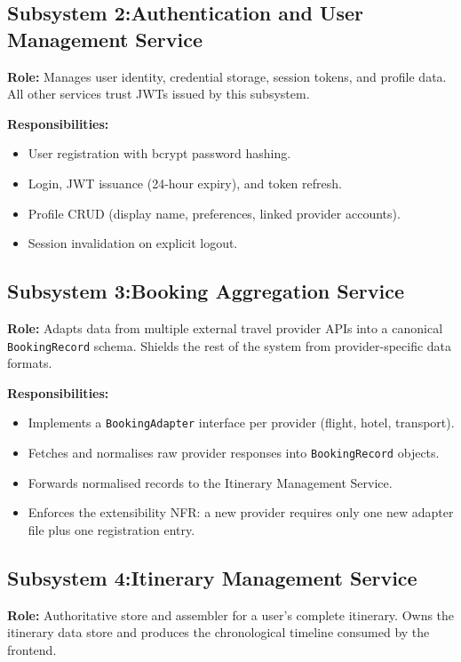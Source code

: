 \documentclass[12pt,a4paper]{article}
\begin{document}
\subsection{Subsystem 2:Authentication and User Management Service}

\textbf{Role:} Manages user identity, credential storage, session tokens, and profile data. All
other services trust JWTs issued by this subsystem.

\textbf{Responsibilities:}
\begin{itemize}[noitemsep]
  \item User registration with bcrypt password hashing.
  \item Login, JWT issuance (24-hour expiry), and token refresh.
  \item Profile CRUD (display name, preferences, linked provider accounts).
  \item Session invalidation on explicit logout.
\end{itemize}

\subsection{Subsystem 3:Booking Aggregation Service}

\textbf{Role:} Adapts data from multiple external travel provider APIs into a canonical
\texttt{BookingRecord} schema. Shields the rest of the system from provider-specific data formats.

\textbf{Responsibilities:}
\begin{itemize}[noitemsep]
  \item Implements a \texttt{BookingAdapter} interface per provider (flight, hotel, transport).
  \item Fetches and normalises raw provider responses into \texttt{BookingRecord} objects.
  \item Forwards normalised records to the Itinerary Management Service.
  \item Enforces the extensibility NFR: a new provider requires only one new adapter file plus
        one registration entry.
\end{itemize}

\subsection{Subsystem 4:Itinerary Management Service}

\textbf{Role:} Authoritative store and assembler for a user's complete itinerary. Owns the
itinerary data store and produces the chronological timeline consumed by the frontend.
\end{document}

